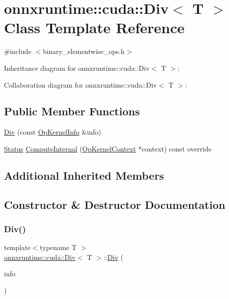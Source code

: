 \hypertarget{classonnxruntime_1_1cuda_1_1Div}{}\section{onnxruntime\+:\+:cuda\+:\+:Div$<$ T $>$ Class Template Reference}
\label{classonnxruntime_1_1cuda_1_1Div}


{\ttfamily \#include $<$binary\+\_\+elementwise\+\_\+ops.\+h$>$}



Inheritance diagram for onnxruntime\+:\+:cuda\+:\+:Div$<$ T $>$\+:


Collaboration diagram for onnxruntime\+:\+:cuda\+:\+:Div$<$ T $>$\+:
\subsection*{Public Member Functions}
\begin{DoxyCompactItemize}
\item 
\mbox{\hyperlink{classonnxruntime_1_1cuda_1_1Div_a215ff461121f42eb3ab5e12d388e7ca5}{Div}} (const \mbox{\hyperlink{classonnxruntime_1_1OpKernelInfo}{Op\+Kernel\+Info}} \&info)
\item 
\mbox{\hyperlink{classonnxruntime_1_1common_1_1Status}{Status}} \mbox{\hyperlink{classonnxruntime_1_1cuda_1_1Div_af4080aced91c8ce3ce2e9a31f08b4f05}{Compute\+Internal}} (\mbox{\hyperlink{classonnxruntime_1_1OpKernelContext}{Op\+Kernel\+Context}} $\ast$context) const override
\end{DoxyCompactItemize}
\subsection*{Additional Inherited Members}


\subsection{Constructor \& Destructor Documentation}
\mbox{\label{classonnxruntime_1_1cuda_1_1Div_a215ff461121f42eb3ab5e12d388e7ca5}} 
\subsubsection{\texorpdfstring{Div()}{Div()}}
{\footnotesize\ttfamily template$<$typename T $>$ \\
\mbox{\hyperlink{classonnxruntime_1_1cuda_1_1Div}{onnxruntime\+::cuda\+::\+Div}}$<$ T $>$\+::\mbox{\hyperlink{classonnxruntime_1_1cuda_1_1Div}{Div}} (\begin{DoxyParamCaption}\item[{const \mbox{\hyperlink{classonnxruntime_1_1OpKernelInfo}{Op\+Kernel\+Info}} \&}]{info }\end{DoxyParamCaption})\hspace{0.3cm}{\ttfamily [inline]}}



